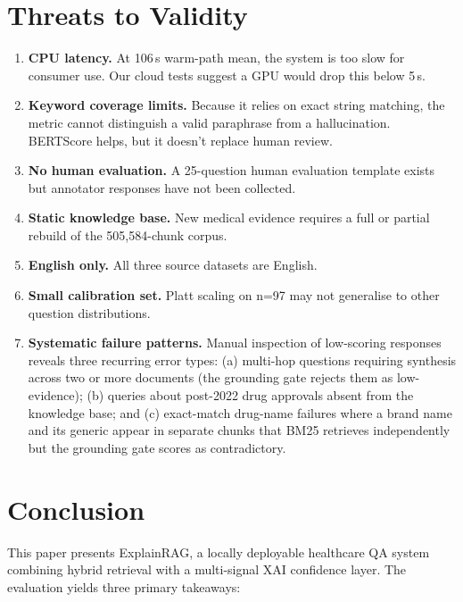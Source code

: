 \documentclass[conference,a4paper]{IEEEtran}
\begin{document}
\section{Threats to Validity}
\label{sec:limitations}

\begin{enumerate}[noitemsep,topsep=2pt]
  \item \textbf{CPU latency.} At 106\,s warm-path mean, the system is
        too slow for consumer use. Our cloud tests suggest a GPU would 
        drop this below 5\,s.
  \item \textbf{Keyword coverage limits.} Because it relies on exact string 
        matching, the metric cannot distinguish a valid paraphrase from a 
        hallucination. BERTScore helps, but it doesn't replace human review.
  \item \textbf{No human evaluation.} A 25-question human evaluation
        template exists but annotator responses have not been collected.
  \item \textbf{Static knowledge base.} New medical evidence requires
        a full or partial rebuild of the 505,584-chunk corpus.
  \item \textbf{English only.} All three source datasets are English.
  \item \textbf{Small calibration set.} Platt scaling on n=97 may not
        generalise to other question distributions.
  \item \textbf{Systematic failure patterns.} Manual inspection of
        low-scoring responses reveals three recurring error types:
        (a) multi-hop questions requiring synthesis across two or more
        documents (the grounding gate rejects them as low-evidence);
        (b) queries about post-2022 drug approvals absent from the
        knowledge base; and (c) exact-match drug-name failures where
        a brand name and its generic appear in separate chunks that
        BM25 retrieves independently but the grounding gate scores
        as contradictory.
\end{enumerate}

\section{Conclusion}
\label{sec:conclusion}

This paper presents ExplainRAG, a locally deployable healthcare QA 
system combining hybrid retrieval with a multi-signal XAI confidence 
layer. The evaluation yields three primary takeaways:
\end{document}

